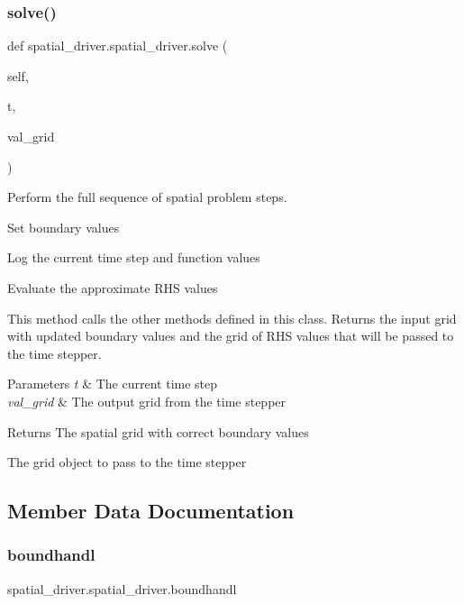 \subsubsection{\texorpdfstring{solve()}{solve()}}
{\footnotesize\ttfamily def spatial\+\_\+driver.\+spatial\+\_\+driver.\+solve (\begin{DoxyParamCaption}\item[{}]{self,  }\item[{}]{t,  }\item[{}]{val\+\_\+grid }\end{DoxyParamCaption})}



Perform the full sequence of spatial problem steps. 


\begin{DoxyEnumerate}
\item Set boundary values
\item Log the current time step and function values
\item Evaluate the approximate R\+HS values
\end{DoxyEnumerate}

This method calls the other methods defined in this class. Returns the input grid with updated boundary values and the grid of R\+HS values that will be passed to the time stepper. 
\begin{DoxyParams}{Parameters}
{\em t} & The current time step \\
\hline
{\em val\+\_\+grid} & The output grid from the time stepper \\
\hline
\end{DoxyParams}
\begin{DoxyReturn}{Returns}
The spatial grid with correct boundary values 

The grid object to pass to the time stepper 
\end{DoxyReturn}


\subsection{Member Data Documentation}
\mbox{\label{classspatial__driver_1_1spatial__driver_aeb66b87c7c18067c8a9a16b47bcbbd2f}} 
\subsubsection{\texorpdfstring{boundhandl}{boundhandl}}
{\footnotesize\ttfamily spatial\+\_\+driver.\+spatial\+\_\+driver.\+boundhandl}




